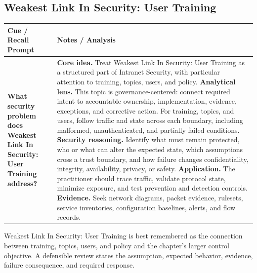 \documentclass[11pt]{article}
\newcommand{\CornellHeader}{%
\rowcolor{Navy}\color{white}\bfseries Cue / Recall Prompt & \color{white}\bfseries Notes / Analysis\\\hline}
\newcommand{\CornellRow}[2]{%
\cellcolor{CueGray}\RaggedRight\textbf{#1} & \RaggedRight #2\\\hline}
\begin{document}
\subsection*{Weakest Link In Security: User Training}
\begin{longtable}{>{\RaggedRight\arraybackslash}p{}|>{\RaggedRight\arraybackslash}p{}}
\CornellHeader
\CornellRow{What security problem does Weakest Link In Security: User Training address?}{\textbf{Core idea.} Treat Weakest Link In Security: User Training as a structured part of Intranet Security, with particular attention to training, topics, users, and policy. \textbf{Analytical lens.} This topic is governance-centered: connect required intent to accountable ownership, implementation, evidence, exceptions, and corrective action. For training, topics, and users, follow traffic and state across each boundary, including malformed, unauthenticated, and partially failed conditions. \textbf{Security reasoning.} Identify what must remain protected, who or what can alter the expected state, which assumptions cross a trust boundary, and how failure changes confidentiality, integrity, availability, privacy, or safety. \textbf{Application.} The practitioner should trace traffic, validate protocol state, minimize exposure, and test prevention and detection controls. \textbf{Evidence.} Seek network diagrams, packet evidence, rulesets, service inventories, configuration baselines, alerts, and flow records.}
\end{longtable}
\begin{topicsummary}
Weakest Link In Security: User Training is best remembered as the connection between training, topics, users, and policy and the chapter's larger control objective. A defensible review states the assumption, expected behavior, evidence, failure consequence, and required response.
\end{topicsummary}
\end{document}
